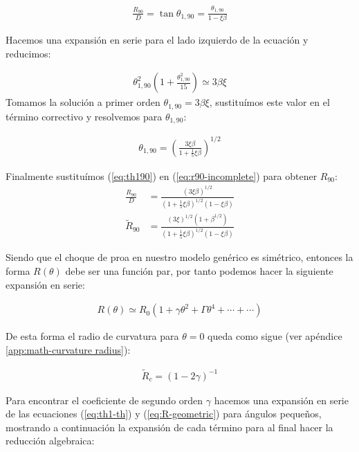 \begin{align}
  \frac{R_{90}}{D} = \tan\theta_{1,90} = \frac{\theta_{1,90}}{1-\xi\beta} \label{eq:r90-incomplete}
\end{align}

Hacemos una expansión en serie para el lado izquierdo de la ecuación y reducimos:

\begin{align}
  \theta^2_{1,90}\left(1 + \frac{\theta^2_{1,90}}{15}\right) \simeq 3\beta\xi
\end{align}
Tomamos la solución a primer orden $\theta_{1,90} = 3\beta\xi$,  sustituímos este valor en el término correctivo y resolvemos para
$\theta_{1,90}$:

\begin{align}
  \theta_{1,90} = \left(\frac{3\xi\beta}{1+\frac{1}{5}\xi\beta}\right)^{1/2} \label{eq:th190}
\end{align}

Finalmente sustituímos (\ref{eq:th190}) en (\ref{eq:r90-incomplete}) para obtener $R_{90}$:
\begin{align}
  \frac{R_{90}}{D} &= \frac{\left(3\xi\beta\right)^{1/2}}{\left(1+\frac{1}{5}\xi\beta\right)^{1/2}\left(1-\xi\beta\right)} \\
  \tilde{R}_{90} &= \frac{\left(3\xi\right)^{1/2}\left(1+\beta^{1/2}\right)}
                   {\left(1+\frac{1}{5}\xi\beta\right)^{1/2}\left(1-\xi\beta\right)} 
\end{align}

Siendo que el choque de proa en nuestro modelo genérico es simétrico, entonces la forma $R(\theta)$ debe ser una función par,
por tanto podemos hacer la siguiente expansión en serie:

\begin{align}
  R(\theta) \simeq R_0\left(1 + \gamma\theta^2 + \Gamma\theta^4 +\cdots +\cdots \right)
\end{align}

De esta forma el radio de curvatura para $\theta=0$ queda como sigue (ver apéndice \ref{app:math-curvature radius}):

\begin{align}
  \tilde{R}_c = \left(1 - 2\gamma\right)^{-1}
\end{align}

Para encontrar el coeficiente de segundo orden $\gamma$ hacemos una expansión en serie de las ecuaciones (\ref{eq:th1-th}) y
(\ref{eq:R-geometric}) para ángulos pequeños, mostrando a continuación la expansión de cada término para al final hacer la
reducción algebraica:

